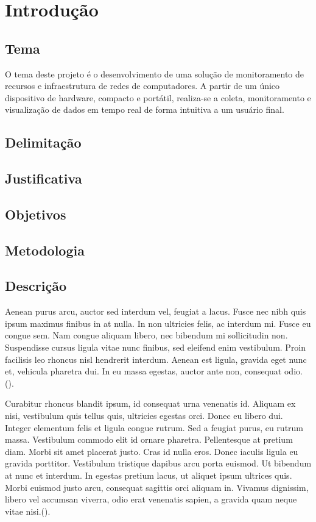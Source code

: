 \chapter{Introdução}

\section{Tema}

O tema deste projeto é o desenvolvimento de uma solução de monitoramento de recursos e infraestrutura de redes de computadores. A partir de um único dispositivo de hardware, compacto e portátil, realiza-se a coleta, monitoramento e visualização de dados em tempo real de forma intuitiva a um usuário final.

\section{Delimitação}


\section{Justificativa}
\section{Objetivos}
\section{Metodologia}
\section{Descrição}

Aenean purus arcu, auctor sed interdum vel, feugiat a lacus. Fusce nec nibh quis ipsum maximus finibus in at nulla. In non ultricies felis, ac interdum mi. Fusce eu congue sem. Nam congue aliquam libero, nec bibendum mi sollicitudin non. Suspendisse cursus ligula vitae nunc finibus, sed eleifend enim vestibulum. Proin facilisis leo rhoncus nisl hendrerit interdum. Aenean est ligula, gravida eget nunc et, vehicula pharetra dui. In eu massa egestas, auctor ante non, consequat odio. (\cite{alvim2007}).

Curabitur rhoncus blandit ipsum, id consequat urna venenatis id. Aliquam ex nisi, vestibulum quis tellus quis, ultricies egestas orci. Donec eu libero dui. Integer elementum felis et ligula congue rutrum. Sed a feugiat purus, eu rutrum massa. Vestibulum commodo elit id ornare pharetra. Pellentesque at pretium diam. Morbi sit amet placerat justo. Cras id nulla eros. Donec iaculis ligula eu gravida porttitor. Vestibulum tristique dapibus arcu porta euismod. Ut bibendum at nunc et interdum. In egestas pretium lacus, ut aliquet ipsum ultrices quis. Morbi euismod justo arcu, consequat sagittis orci aliquam in. Vivamus dignissim, libero vel accumsan viverra, odio erat venenatis sapien, a gravida quam neque vitae nisi.(\cite{mme2020}). 

